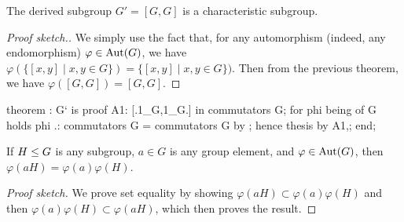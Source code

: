 \begin{theorem}
The derived subgroup $G'=[G,G]$ is a characteristic subgroup.
\end{theorem}

\begin{proof}[Proof sketch.]
We simply use the fact that, for any automorphism (indeed, any
endomorphism) $\varphi\in\operatorname{Aut}(G)$, we have
$\varphi(\{[x,y]\mid x,y\in G\})=\{[x,y]\mid x,y\in G\})$. Then from the
previous theorem, we have $\varphi([G,G])=[G,G]$.
\end{proof}

\nwenddocs{}\endmoddef\nwstartdeflinemarkup{}\nwenddeflinemarkup
theorem :
  G` is 
proof
  A1: [.1_G,1_G.] in commutators G;
  for phi being  of G holds phi .: commutators G = commutators G
  by ;
  hence thesis by A1,;
end;
\eatline
{}\nwendcode{}\nwdocspar
\begin{theorem}
If $H\leq G$ is any subgroup, $a\in G$ is any group element, and
$\varphi\in\operatorname{Aut}(G)$, then $\varphi(aH)=\varphi(a)\varphi(H)$.
\end{theorem}

\begin{proof}[Proof sketch]
We prove set equality by showing $\varphi(aH)\subset\varphi(a)\varphi(H)$ and then
$\varphi(a)\varphi(H)\subset\varphi(aH)$, which then proves the result.
\end{proof}

